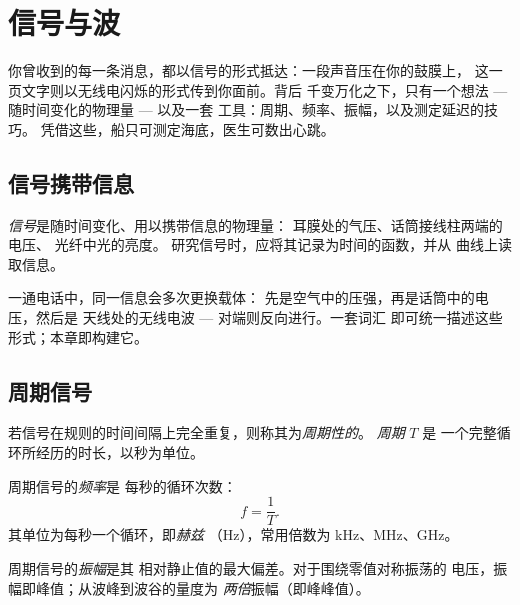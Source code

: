 \chapter{信号与波}\label{ch:g10:signals-and-waves}

你曾收到的每一条消息，都以信号的形式抵达：一段声音压在你的鼓膜上，
这一页文字则以无线电闪烁的形式传到你面前。背后
千变万化之下，只有一个想法 --- 随时间变化的物理量 --- 以及一套
工具：周期、频率、振幅，以及测定延迟的技巧。
凭借这些，船只可测定海底，医生可数出心跳。

\section{信号携带信息}

\begin{definition}[信号]\label{def:g10:signals-and-waves:signal}
\emph{信号}是随时间变化、用以携带信息的物理量：
耳膜处的气压、话筒接线柱两端的电压、
光纤中光的亮度。
研究信号时，应将其记录为时间的函数，并从
曲线上读取信息。
\end{definition}

一通电话中，同一信息会多次更换载体：
先是空气中的压强，再是话筒中的电压，然后是
天线处的无线电波 --- 对端则反向进行。一套词汇
即可统一描述这些形式；本章即构建它。

\section{周期信号}

\begin{definition}[周期信号、周期]\label{def:g10:signals-and-waves:period}
若信号在规则的时间间隔上完全重复，则称其为\emph{周期性的}。
\emph{周期} $T$ 是
一个完整循环所经历的时长，以秒为单位。
\end{definition}

\begin{definition}[频率]\label{def:g10:signals-and-waves:frequency}
周期信号的\emph{频率}是
每秒的循环次数：
\[
f = \frac{1}{T} .
\]
其单位为每秒一个循环，即\emph{赫兹}
（\unit{Hz}），常用倍数为 \unit{kHz}、\unit{MHz}、\unit{GHz}。
\end{definition}

\begin{definition}[振幅]\label{def:g10:signals-and-waves:amplitude}
周期信号的\emph{振幅}是其
相对静止值的最大偏差。对于围绕零值对称振荡的
电压，振幅即峰值；从波峰到波谷的量度为
\emph{两倍}振幅（即峰峰值）。
\end{definition}

